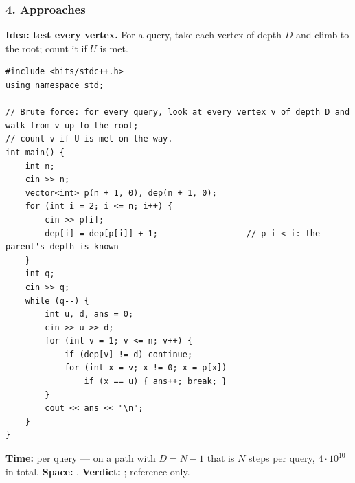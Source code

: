 \subsubsection*{4. Approaches}

\begin{bruteforcebox}
\textbf{Idea: test every vertex.} For a query, take each vertex of depth $D$ and climb to the root; count it if $U$ is met.

\begin{lstlisting}[style=cpp]
#include <bits/stdc++.h>
using namespace std;

// Brute force: for every query, look at every vertex v of depth D and walk from v up to the root;
// count v if U is met on the way.
int main() {
    int n;
    cin >> n;
    vector<int> p(n + 1, 0), dep(n + 1, 0);
    for (int i = 2; i <= n; i++) {
        cin >> p[i];
        dep[i] = dep[p[i]] + 1;                  // p_i < i: the parent's depth is known
    }
    int q;
    cin >> q;
    while (q--) {
        int u, d, ans = 0;
        cin >> u >> d;
        for (int v = 1; v <= n; v++) {
            if (dep[v] != d) continue;
            for (int x = v; x != 0; x = p[x])
                if (x == u) { ans++; break; }
        }
        cout << ans << "\n";
    }
}
\end{lstlisting}

\begin{complexitybox}
\textbf{Time:}  per query --- on a path with $D = N-1$ that is $N$ steps per query, $4\cdot10^{10}$ in total. \textbf{Space:} . \textbf{Verdict:} \tle{}; reference only.
\end{complexitybox}
\end{bruteforcebox}

